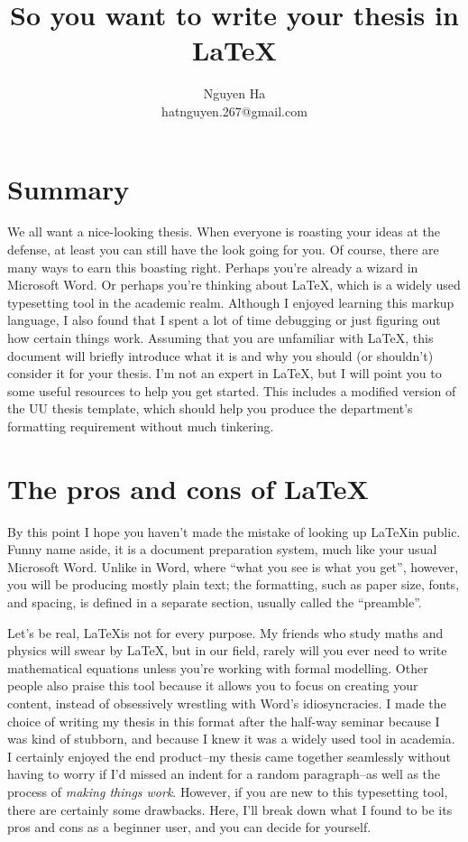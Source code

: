\documentclass[12pt, letterpaper]{article}
\title{So you want to write your thesis in \LaTeX}
\author{Nguyen Ha\\hatnguyen.267@gmail.com}
\begin{document}
\maketitle
\vspace{.3in}

\section{Summary}
We all want a nice-looking thesis. When everyone is roasting your ideas at the defense, at least you can still have the look going for you. Of course, there are many ways to earn this boasting right. Perhaps you're already a wizard in Microsoft Word. Or perhaps you're thinking about \LaTeX, which is a widely used typesetting tool in the academic realm. Although I enjoyed learning this markup language, I also found that I spent a lot of time debugging or just figuring out how certain things work. Assuming that you are unfamiliar with \LaTeX, this document will briefly introduce what it is and why you should (or shouldn't) consider it for your thesis. I'm not an expert in \LaTeX, but I will point you to some useful resources to help you get started. This includes a modified version of the UU thesis template, which should help you produce the department's formatting requirement without much tinkering. 

\section{The pros and cons of \LaTeX}
By this point I hope you haven't made the mistake of looking up \LaTeX in public. Funny name aside, it is a document preparation system, much like your usual Microsoft Word. Unlike in Word, where ``what you see is what you get'', however, you will be producing mostly plain text; the formatting, such as paper size, fonts, and spacing, is defined in a separate section, usually called the ``preamble''. 

Let's be real, \LaTeX is not for every purpose. My friends who study maths and physics will swear by \LaTeX, but in our field, rarely will you ever need to write mathematical equations unless you're working with formal modelling. Other people also praise this tool because it allows you to focus on creating your content, instead of obsessively wrestling with Word's idiosyncracies. I made the choice of writing my thesis in this format after the half-way seminar because I was kind of stubborn, and because I knew it was a widely used tool in academia. I certainly enjoyed the end product--my thesis came together seamlessly without having to worry if I'd missed an indent for a random paragraph--as well as the process of \emph{making things work}. However, if you are new to this typesetting tool, there are certainly some drawbacks. Here, I'll break down what I found to be its pros and cons as a beginner user, and you can decide for yourself.
\end{document}

